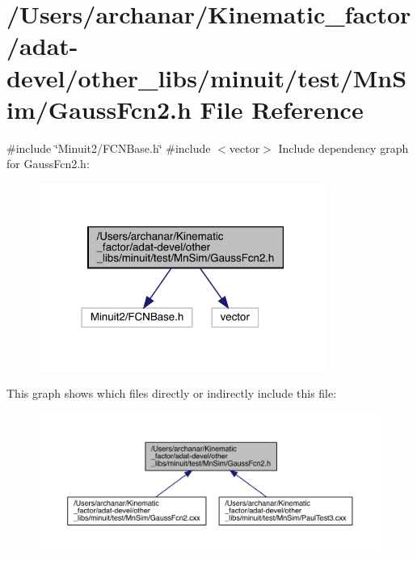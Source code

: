 \hypertarget{adat-devel_2other__libs_2minuit_2test_2MnSim_2GaussFcn2_8h}{}\section{/\+Users/archanar/\+Kinematic\+\_\+factor/adat-\/devel/other\+\_\+libs/minuit/test/\+Mn\+Sim/\+Gauss\+Fcn2.h File Reference}
\label{adat-devel_2other__libs_2minuit_2test_2MnSim_2GaussFcn2_8h}
{\ttfamily \#include \char`\"{}Minuit2/\+F\+C\+N\+Base.\+h\char`\"{}}\newline
{\ttfamily \#include $<$vector$>$}\newline
Include dependency graph for Gauss\+Fcn2.\+h\+:
\nopagebreak
\begin{figure}[H]
\begin{center}
\leavevmode
\includegraphics[width=267pt]{d6/d21/adat-devel_2other__libs_2minuit_2test_2MnSim_2GaussFcn2_8h__incl}
\end{center}
\end{figure}
This graph shows which files directly or indirectly include this file\+:
\nopagebreak
\begin{figure}[H]
\begin{center}
\leavevmode
\includegraphics[width=350pt]{da/d51/adat-devel_2other__libs_2minuit_2test_2MnSim_2GaussFcn2_8h__dep__incl}
\end{center}
\end{figure}
